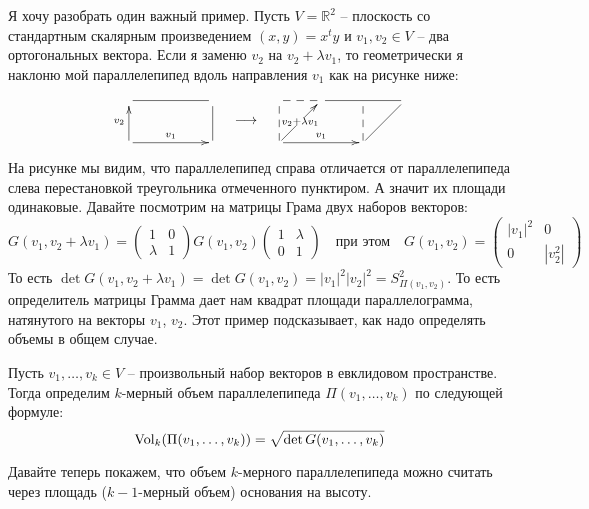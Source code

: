 Я хочу разобрать один важный пример. Пусть $V = \mathbb R^2$ -- плоскость со стандартным скалярным произведением $(x, y) = x^t y$ и $v_1,v_2\in V$ -- два ортогональных вектора.  Если я заменю $v_2$ на $v_2 + \lambda v_1$, то геометрически я наклоню мой параллелепипед вдоль направления $v_1$ как на рисунке ниже:
\[
\begin{aligned}
\xymatrix{
	{}\ar@{-}[rr]&{}&{}\\
	{}\ar[u]^{v_2}\ar[rr]^{v_1}&{}&{}\ar@{-}[u]\\
}
\end{aligned}
\quad\longrightarrow\quad
\begin{aligned}
\xymatrix{
	{}\ar@{--}[r]&{}\ar@{-}[rr]&{}&{}\\
	{}\ar@{--}[u]\ar[rr]^{v_1}\ar[ru]|{v_2 + \lambda v_1}&{}&{}\ar@{--}[u]\ar@{-}[ru]&{}\\
}
\end{aligned}
\]
На рисунке мы видим, что параллелепипед справа отличается от параллелепипеда слева перестановкой треугольника отмеченного пунктиром. А значит их площади одинаковые. Давайте посмотрим на матрицы Грама двух наборов векторов:
\[
G(v_1, v_2 + \lambda v_1) = 
\begin{pmatrix}
{1}&{0}\\
{\lambda}&{1}
\end{pmatrix}
G(v_1,v_2)
\begin{pmatrix}
{1}&{\lambda}\\
{0}&{1}
\end{pmatrix}
\quad\text{при этом}\quad
G(v_1,v_2) =
\begin{pmatrix}
{|v_1|^2}&{0}\\
{0}&{|v_2^2|}
\end{pmatrix}
\]
То есть $\det G(v_1,v_2 + \lambda v_1) = \det G(v_1,v_2) = |v_1|^2 |v_2|^2 = S_{\Pi(v_1,v_2)}^2$. То есть определитель матрицы Грамма дает нам квадрат площади параллелограмма, натянутого на векторы $v_1$, $v_2$. Этот пример подсказывает, как надо определять объемы в общем случае.

\begin{definition}
Пусть $v_1,\ldots, v_k\in V$ -- произвольный набор векторов в евклидовом пространстве. Тогда определим $k$-мерный объем параллелепипеда $\Pi(v_1,\ldots,v_k)$ по следующей формуле:
\[
\operatorname{Vol}_k(\Pi(v_1,\ldots,v_k)) = \sqrt{\det G(v_1,\ldots,v_k)}
\]
\end{definition}

Давайте теперь покажем, что объем $k$-мерного параллелепипеда можно считать через площадь ($k-1$-мерный объем) основания на высоту.


